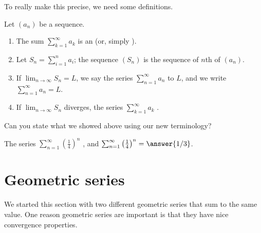 \documentclass{ximera}
\begin{document}
To really make this precise, we need some definitions. 
\begin{definition}
Let $(a_n)$ be a sequence.
\begin{enumerate}
\item The sum $\sum_{k=1}^\infty a_k$ is an  (or,
  simply ).
\item Let $S_n = \sum_{i=1}^n a_i$; the sequence $(S_n)$ is the
  sequence of $n$th  of $(a_n)$.
\item If $\lim_{n\to\infty} S_n = L$, we say the series
  $\sum_{n=1}^\infty a_n$  to $L$, and we write
  $\sum_{n=1}^\infty a_n = L$.
\item If $\lim_{n\to\infty} S_n$ diverges, the series
  $\sum_{k=1}^\infty a_k$ .
\end{enumerate}
\end{definition}

\begin{question}
  Can you state what we showed above using our new terminology?
  \begin{prompt}
    The series $\sum_{n=1}^\infty \left(\frac{1}{4}\right)^n$
    , and
      $\sum_{n=1}^\infty \left(\frac{1}{4}\right)^n = \answer{1/3}$.
  \end{prompt}
\end{question}


\section{Geometric series}

We started this section with two different geometric series that sum
to the same value. One reason geometric series are important is that
they have nice convergence properties.
\end{document}
